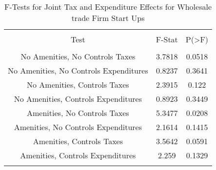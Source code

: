 
\begin{table}[!htbp] \centering 
  \caption{F-Tests for Joint Tax and Expenditure Effects for Wholesale trade Firm Start Ups} 
  \label{42Ftests} 
\begin{tabular}{@{\extracolsep{5pt}} ccc} 
\\[-1.8ex]\hline 
\hline \\[-1.8ex] 
Test & F-Stat & P(\textgreater F) \\ 
\hline \\[-1.8ex] 
No Amenities, No Controls Taxes & 3.7818 & 0.0518 \\ 
No Amenities, No Controls Expenditures & 0.8237 & 0.3641 \\ 
No Amenities, Controls Taxes & 2.3915 & 0.122 \\ 
No Amenities, Controls Expenditures & 0.8923 & 0.3449 \\ 
Amenities, No Controls Taxes & 5.3477 & 0.0208 \\ 
Amenities, No Controls Expenditures & 2.1614 & 0.1415 \\ 
Amenities, Controls Taxes & 3.5642 & 0.0591 \\ 
Amenities, Controls Expenditures & 2.259 & 0.1329 \\ 
\hline \\[-1.8ex] 
\end{tabular} 
\end{table} 
